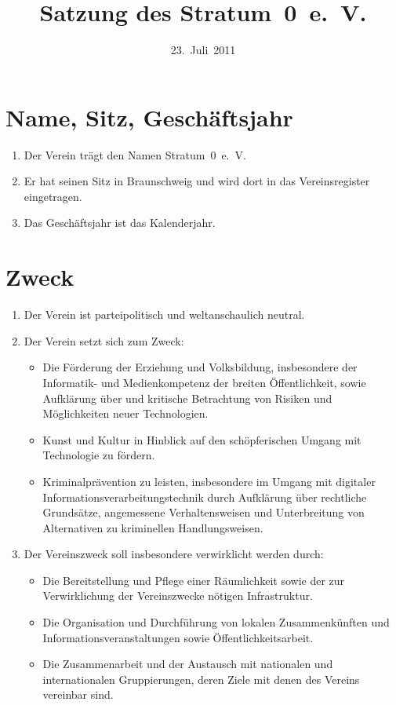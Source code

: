 \documentclass[a4paper,12pt]{scrartcl}
\title{Satzung des Stratum~0~e.~V.}
\date{23.~Juli~2011}
\begin{document}
\maketitle

\section{Name, Sitz, Geschäftsjahr}
\begin{enumerate}
  \item Der Verein trägt den Namen Stratum~0~e.~V.
  \item Er hat seinen Sitz in Braunschweig und wird dort in das Vereinsregister
    eingetragen.
  \item Das Geschäftsjahr ist das Kalenderjahr.
\end{enumerate}

\section{Zweck}
\begin{enumerate}
  \item Der Verein ist parteipolitisch und weltanschaulich neutral.
  \item Der Verein setzt sich zum Zweck:
    \begin{itemize}
      \item
         Die Förderung der Erziehung und Volksbildung, insbesondere der
         Informatik- und Medienkompetenz der breiten Öffentlichkeit, sowie
         Aufklärung über und kritische Betrachtung von Risiken und
         Möglichkeiten neuer Technologien.
      \item Kunst und Kultur in Hinblick auf den schöpferischen Umgang mit
        Technologie zu fördern.
      \item Kriminalprävention zu leisten, insbesondere im Umgang mit digitaler
        Informationsverarbeitungstechnik durch Aufklärung über rechtliche
        Grundsätze, angemessene Verhaltensweisen und Unterbreitung von
        Alternativen zu kriminellen Handlungsweisen.
    \end{itemize}
  \item Der Vereinszweck soll insbesondere verwirklicht werden durch:
    \begin{itemize}
      \item Die Bereitstellung und Pflege einer Räumlichkeit sowie der zur
        Verwirklichung der Vereinszwecke nötigen Infrastruktur.
      \item Die Organisation und Durchführung von lokalen Zusammenkünften und
        Informationsveranstaltungen sowie Öffentlichkeitsarbeit.
      \item Die Zusammenarbeit und der Austausch mit nationalen und
        internationalen Gruppierungen, deren Ziele mit denen des Vereins
        vereinbar sind.
    \end{itemize}
\end{enumerate}
\end{document}
